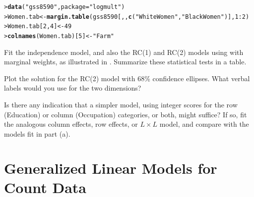 \documentclass[10pt]{report}\usepackage[]{graphicx}\usepackage[]{color}
\makeatletter
\newcommand{\hlnum}[1]{\textcolor[rgb]{0.686,0.059,0.569}{#1}}%
\newcommand{\hlstr}[1]{\textcolor[rgb]{0.192,0.494,0.8}{#1}}%
\newcommand{\hlopt}[1]{\textcolor[rgb]{0,0,0}{#1}}%
\newcommand{\hlstd}[1]{\textcolor[rgb]{0.345,0.345,0.345}{#1}}%
\newcommand{\hlkwb}[1]{\textcolor[rgb]{0.69,0.353,0.396}{#1}}%
\newcommand{\hlkwc}[1]{\textcolor[rgb]{0.333,0.667,0.333}{#1}}%
\newcommand{\hlkwd}[1]{\textcolor[rgb]{0.737,0.353,0.396}{\textbf{#1}}}%
\newenvironment{kframe}{%
 \def\at@end@of@kframe{}%
 \ifinner\ifhmode%
  \def\at@end@of@kframe{\end{minipage}}%
  \begin{minipage}{\columnwidth}%
 \fi\fi%
 \def\FrameCommand##1{\hskip\@totalleftmargin \hskip-\fboxsep
 \colorbox{shadecolor}{##1}\hskip-\fboxsep
     \hskip-\linewidth \hskip-\@totalleftmargin \hskip\columnwidth}%
 \MakeFramed {\advance\hsize-\width
   \@totalleftmargin\z@ \linewidth\hsize
   \@setminipage}}%
 {\par\unskip\endMakeFramed%
 \at@end@of@kframe}
\newenvironment{knitrout}{}{} %
\renewenvironment{knitrout}{\small\renewcommand{\baselinestretch}{.85}}{} %
\makeatother
\begin{document}
\begin{Exercises}
\begin{knitrout}\footnotesize
{}\color{fgcolor}\begin{kframe}
\begin{alltt}
\hlstd{> }\hlkwd{data}\hlstd{(}\hlstr{"gss8590"}\hlstd{,} \hlkwc{package}\hlstd{=}\hlstr{"logmult"}\hlstd{)}
\hlstd{> }\hlstd{Women.tab} \hlkwb{<-} \hlkwd{margin.table}\hlstd{(gss8590[,,}\hlkwd{c}\hlstd{(}\hlstr{"White Women"}\hlstd{,} \hlstr{"Black Women"}\hlstd{)],} \hlnum{1}\hlopt{:}\hlnum{2}\hlstd{)}
\hlstd{> }\hlstd{Women.tab[}\hlnum{2}\hlstd{,}\hlnum{4}\hlstd{]} \hlkwb{<-} \hlnum{49}
\hlstd{> }\hlkwd{colnames}\hlstd{(Women.tab)[}\hlnum{5}\hlstd{]} \hlkwb{<-} \hlstr{"Farm"}
\end{alltt}
\end{kframe}
\end{knitrout}
  \begin{enumerate*}
    \item Fit the independence model, and also the RC(1) and RC(2) models using
     with marginal weights, as illustrated in .
    Summarize these statistical tests in a table.
    \begin{ans}
    \end{ans}
    
    \item Plot the solution for the RC(2) model with 68\% confidence ellipses.
    What verbal labels would you use for the two dimensions?
    \begin{ans}
    \end{ans}
    
    \item Is there any indication that a simpler model, using integer scores for
    the row (Education) or column (Occupation) categories, or both, might suffice?
    If so, fit the analogous column effects, row effects, or $L \times L$ model,
    and compare with the models fit in part (a).
    \begin{ans}
    \end{ans}
    
  \end{enumerate*}


\end{Exercises}

\chapter{Generalized Linear Models for Count Data}\label{ch:glm}
\end{document}
